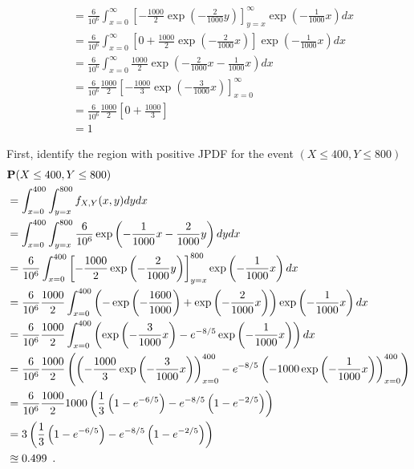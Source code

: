 \begin{example}
{\begin{align*}
&= \frac{6}{10^6} \int_{x=0}^{\infty} \left[ -\frac{1000}{2} \exp \left( -\frac{2}{1000}y \right) \right]_{y=x}^{\infty}  \exp \left(-\frac{1}{1000}x\right) dx\\
&= \frac{6}{10^6} \int_{x=0}^{\infty} \left[0 +\frac{1000}{2}\exp \left( -\frac{2}{1000}x \right) \right]  \exp \left(-\frac{1}{1000}x\right) dx\\
&= \frac{6}{10^6} \int_{x=0}^{\infty} \frac{1000}{2}\exp \left( -\frac{2}{1000}x -\frac{1}{1000}x\right) dx\\
&= \frac{6}{10^6} \frac{1000}{2} \left[ -\frac{1000}{3} \exp \left(-\frac{3}{1000}x\right)\right]_{x=0}^{\infty} \\
&= \frac{6}{10^6} \frac{1000}{2} \left[0 +\frac{1000}{3} \right] \\
&=1
\end{align*}
}
\item
First, identify the region with positive JPDF for the event $(X \leq 400, Y \leq 800)$
{\scriptsize
\begin{align*}
&\mathbf{P}(X \leq 400, Y \leq 800)\\
&= \int_{x=0}^{400} \int_{y=x}^{800} f_{X,Y}(x,y) dy dx \\
&= \int_{x=0}^{400} \int_{y=x}^{800} \frac{6}{10^6} \exp \left( -\frac{1}{1000}x-\frac{2}{1000}y \right) dy dx \\
&= \frac{6}{10^6}  \int_{x=0}^{400} \left[ -\frac{1000}{2} \exp \left( -\frac{2}{1000}y \right) \right]_{y=x}^{800}  \exp \left(-\frac{1}{1000}x\right) dx\\
&= \frac{6}{10^6} \frac{1000}{2} \int_{x=0}^{400} \left( - \exp \left( -\frac{1600}{1000} \right) + \exp \left( -\frac{2}{1000}x \right) \right)  \exp \left(-\frac{1}{1000}x\right) dx\\
&= \frac{6}{10^6} \frac{1000}{2} \int_{x=0}^{400} \left( \exp \left( -\frac{3}{1000}x \right) - e^{-8/5} \exp \left(-\frac{1}{1000}x\right)\right) dx\\
&= \frac{6}{10^6} \frac{1000}{2} \left( \left( -\frac{1000}{3} \exp \left( -\frac{3}{1000}x \right) \right)_{x=0}^{400} - e^{-8/5} \left(-1000 \exp \left(-\frac{1}{1000}x\right)\right)_{x=0}^{400} \right) \\
&= \frac{6}{10^6} \frac{1000}{2} 1000 \left( \frac{1}{3}\left(1- e^{-6/5} \right) - e^{-8/5} \left( 1-e^{-2/5}\right) \right) \\
&= 3 \left( \frac{1}{3}\left(1- e^{-6/5} \right) - e^{-8/5} \left( 1-e^{-2/5}\right) \right) \\
&\approxeq 0.499 \enspace .
\end{align*}
}
\end{example}
